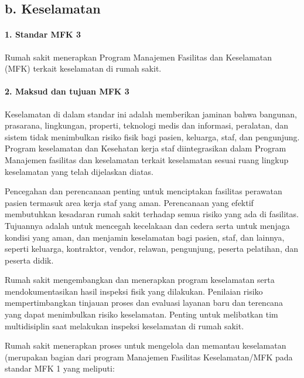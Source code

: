 \documentclass[
]{book}
\begin{document}
\hypertarget{b.-keselamatan}{%
\subsection*{b. Keselamatan}\label{b.-keselamatan}}

\hypertarget{standar-mfk-3}{%
\paragraph*{1. Standar MFK 3}\label{standar-mfk-3}}

Rumah sakit menerapkan Program Manajemen Fasilitas dan Keselamatan (MFK) terkait keselamatan di rumah sakit.

\hypertarget{maksud-dan-tujuan-mfk-3}{%
\paragraph*{2. Maksud dan tujuan MFK 3}\label{maksud-dan-tujuan-mfk-3}}

Keselamatan di dalam standar ini adalah memberikan jaminan bahwa bangunan, prasarana, lingkungan, properti, teknologi medis dan informasi, peralatan, dan sistem tidak menimbulkan risiko fisik bagi pasien, keluarga, staf, dan pengunjung.
Program keselamatan dan Kesehatan kerja staf diintegrasikan dalam Program Manajemen fasilitas dan keselamatan terkait keselamatan sesuai ruang lingkup keselamatan yang telah dijelaskan diatas.

Pencegahan dan perencanaan penting untuk menciptakan fasilitas perawatan pasien termasuk area kerja staf yang aman. Perencanaan yang efektif membutuhkan kesadaran rumah sakit terhadap semua risiko yang ada di fasilitas. Tujuannya adalah untuk mencegah kecelakaan dan cedera serta untuk menjaga kondisi yang aman, dan menjamin keselamatan bagi pasien, staf, dan lainnya, seperti keluarga, kontraktor, vendor, relawan, pengunjung, peserta pelatihan, dan peserta didik.

Rumah sakit mengembangkan dan menerapkan program keselamatan serta mendokumentasikan hasil inspeksi fisik yang dilakukan. Penilaian risiko mempertimbangkan tinjauan proses dan evaluasi layanan baru dan terencana yang dapat menimbulkan risiko keselamatan. Penting untuk melibatkan tim multidisiplin saat melakukan inspeksi keselamatan di rumah sakit.

Rumah sakit menerapkan proses untuk mengelola dan memantau keselamatan (merupakan bagian dari program Manajemen Fasilitas Keselamatan/MFK pada standar MFK 1 yang meliputi:
\end{document}
